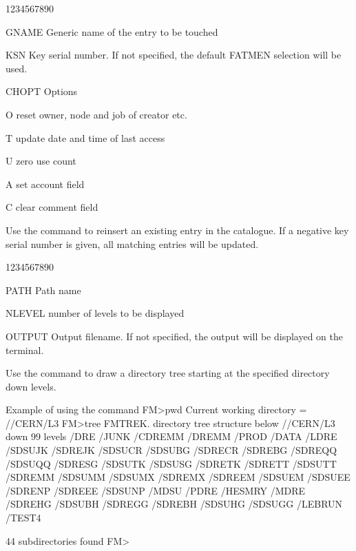 \begin{DLtt}{1234567890}
\item[GNAME]Generic name of the entry to be touched
\item[KSN]Key serial number. If not specified, the default FATMEN
selection will be used.
\item[CHOPT]Options
\begin{DLtt}{12}
\item[O]reset owner, node and job of creator etc.
\item[T]update date and time of last access
\item[U]zero use count
\item[A]set account field
\item[C]clear comment field
\end{DLtt}
\end{DLtt}
Use the  command to reinsert an existing entry in the catalogue.
If a negative key serial number is given, all matching entries
will be updated.

\begin{DLtt}{1234567890}
\item[PATH]Path name
\item[NLEVEL]number of levels to be displayed
\item[OUTPUT]Output filename. If not specified, the output will 
be displayed on the terminal.
\end{DLtt}
Use the  command to draw a directory tree starting at the
specified directory down  levels.
\begin{XMPt}{Example of using the \protect{} command}
FM>pwd
Current working directory = //CERN/L3
FM>tree
 FMTREK. directory tree structure below //CERN/L3 down          99  levels      
          /DRE
          /JUNK
          /CDREMM
          /DREMM 
          /PROD
               /DATA
                    /LDRE
                    /SDSUJK
                    /SDREJK
                    /SDSUCR
                    /SDSUBG
                    /SDRECR
                    /SDREBG
                    /SDREQQ
                    /SDSUQQ
                    /SDRESG
                    /SDSUTK
                    /SDSUSG
                    /SDRETK
                    /SDRETT
                    /SDSUTT
                    /SDREMM
                    /SDSUMM
                    /SDSUMX
                    /SDREMX
                    /SDREEM
                    /SDSUEM
                    /SDSUEE
                    /SDRENP
                    /SDREEE
                    /SDSUNP
                    /MDSU
                    /PDRE
                    /HESMRY
                    /MDRE
                    /SDREHG
                    /SDSUBH
                    /SDREGG
                    /SDREBH
                    /SDSUHG
                    /SDSUGG
          /LEBRUN
          /TEST4

          44  subdirectories found
FM>
\end{XMPt}

